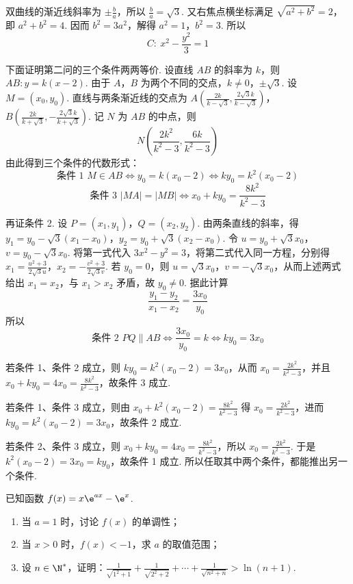 \begin{solution}
双曲线的渐近线斜率为 \(\pm\frac ba\)，所以 \(\frac ba=\sqrt3\). 又右焦点横坐标满足
\(\sqrt{a^2+b^2}=2\)，即 \(a^2+b^2=4\). 因而 \(b^2=3a^2\)，解得 \(a^2=1\)，\(b^2=3\). 所以
\[
C:\ x^2-\frac{y^2}{3}=1
\]

下面证明第二问的三个条件两两等价. 设直线 \(AB\) 的斜率为 \(k\)，则
\(AB:y=k(x-2)\). 由于 \(A\)，\(B\) 为两个不同的交点，\(k\ne0\)，\(\pm\sqrt3\). 设 \(M=(x_0,y_0)\). 直线与两条渐近线的交点为
\(A\left(\frac{2k}{k-\sqrt3},\frac{2\sqrt3k}{k-\sqrt3}\right)\)，\(B\left(\frac{2k}{k+\sqrt3},-\frac{2\sqrt3k}{k+\sqrt3}\right)\).
记 \(N\) 为 \(AB\) 的中点，则
\[
N\left(\frac{2k^2}{k^2-3},\frac{6k}{k^2-3}\right)
\]
由此得到三个条件的代数形式：
\[
\text{条件 1 }M\in AB\Longleftrightarrow y_0=k(x_0-2)\Longleftrightarrow ky_0=k^2(x_0-2)
\]
\[
\text{条件 3 }|MA|=|MB|\Longleftrightarrow x_0+ky_0=\dfrac{8k^2}{k^2-3}
\]

再证条件 2. 设 \(P=(x_1,y_1)\)，\(Q=(x_2,y_2)\). 由两条直线的斜率，得
\(y_1=y_0-\sqrt3(x_1-x_0)\)，\(y_2=y_0+\sqrt3(x_2-x_0)\).
令 \(u=y_0+\sqrt3x_0\)，\(v=y_0-\sqrt3x_0\). 将第一式代入 \(3x^2-y^2=3\)，将第二式代入同一方程，分别得
\(x_1=\frac{u^2+3}{2\sqrt3u}\)，\(x_2=-\frac{v^2+3}{2\sqrt3v}\).
若 \(y_0=0\)，则 \(u=\sqrt3x_0\)，\(v=-\sqrt3x_0\)，从而上述两式给出 \(x_1=x_2\)，与 \(x_1>x_2\) 矛盾，故 \(y_0\ne0\).
据此计算
\[
\frac{y_1-y_2}{x_1-x_2}=\frac{3x_0}{y_0}
\]
所以
\[
\text{条件 2 }PQ\parallel AB\Longleftrightarrow \frac{3x_0}{y_0}=k\Longleftrightarrow ky_0=3x_0
\]

若条件 1、条件 2 成立，则 \(ky_0=k^2(x_0-2)=3x_0\)，从而 \(x_0=\frac{2k^2}{k^2-3}\)，并且
\(x_0+ky_0=4x_0=\frac{8k^2}{k^2-3}\)，故条件 3 成立.

若条件 1、条件 3 成立，则由
\(x_0+k^2(x_0-2)=\frac{8k^2}{k^2-3}\) 得 \(x_0=\frac{2k^2}{k^2-3}\)，进而
\(ky_0=k^2(x_0-2)=3x_0\)，故条件 2 成立.

若条件 2、条件 3 成立，则 \(x_0+ky_0=4x_0=\frac{8k^2}{k^2-3}\)，所以 \(x_0=\frac{2k^2}{k^2-3}\). 于是
\(k^2(x_0-2)=3x_0=ky_0\)，故条件 1 成立. 所以任取其中两个条件，都能推出另一个条件.
\end{solution}


\begin{problem}
已知函数 \(f(x)=x\e^{ax}-\e^x\).
\begin{enumerate}
\item 当 \(a=1\) 时，讨论 \(f(x)\) 的单调性；
\item 当 \(x>0\) 时，\(f(x)<-1\)，求 \(a\) 的取值范围；
\item 设 \(n\in \N^*\)，证明：\(\frac{1}{\sqrt{1^2+1}}+\frac{1}{\sqrt{2^2+2}}+\cdots+\frac{1}{\sqrt{n^2+n}}>\ln(n+1)\).
\end{enumerate}
\end{problem}

